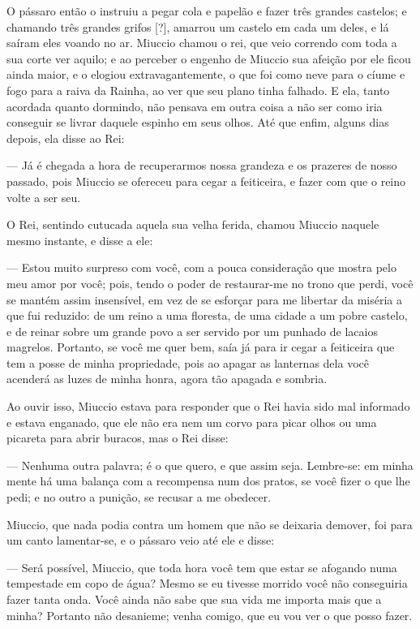 O pássaro então o instruiu a pegar cola e papelão e fazer três grandes
castelos; e chamando três grandes grifos [?], amarrou um castelo em
cada um deles, e lá saíram eles voando no ar. Miuccio chamou o rei,
que veio correndo com toda a sua corte ver aquilo; e ao perceber o
engenho de Miuccio sua afeição por ele ficou ainda maior, e o elogiou
extravagantemente, o que foi como neve para o cíume e fogo para a
raiva da Rainha, ao ver que seu plano tinha falhado. E ela, tanto
acordada quanto dormindo, não pensava em outra coisa a não ser como
iria conseguir se livrar daquele espinho em seus olhos. Até que
enfim, alguns dias depois, ela disse ao Rei:

— Já é chegada a hora de recuperarmos nossa grandeza e os prazeres de
nosso passado, pois Miuccio se ofereceu para cegar a feiticeira, e
fazer com que o reino volte a ser seu.

O Rei, sentindo cutucada aquela sua velha ferida, chamou Miuccio
naquele mesmo instante, e disse a ele:

— Estou muito surpreso com você, com a pouca consideração que mostra
pelo meu amor por você; pois, tendo o poder de restaurar-me no trono
que perdi, você se mantém assim insensível, em vez de se esforçar
para me libertar da miséria a que fui reduzido: de um reino a uma
floresta, de uma cidade a um pobre castelo, e de reinar sobre um
grande povo a ser servido por um punhado de lacaios magrelos.
Portanto, se você me quer bem, saía já para ir cegar a feiticeira que
tem a posse de minha propriedade, pois ao apagar as lanternas dela
você acenderá as luzes de minha honra, agora tão apagada e sombria.

Ao ouvir isso, Miuccio estava para responder que o Rei havia sido mal
informado e estava enganado, que ele não era nem um corvo para picar
olhos ou uma picareta para abrir buracos, mas o Rei disse:

— Nenhuma outra palavra; é o que quero, e que assim seja. Lembre-se:
em minha mente há uma balança com a recompensa num dos pratos, se
você fizer o que lhe pedi; e no outro a punição, se recusar a me
obedecer.

Miuccio, que nada podia contra um homem que não se deixaria demover,
foi para um canto lamentar-se, e o pássaro veio até ele e disse:

— Será possível, Miuccio, que toda hora você tem que estar se afogando
numa tempestade em copo de água? Mesmo se eu tivesse morrido você não
conseguiria fazer tanta onda. Você ainda não sabe que sua vida me
importa mais que a minha? Portanto não desanieme; venha comigo, que
eu vou ver o que posso fazer.

